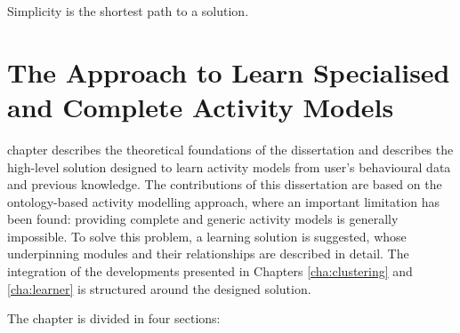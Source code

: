 

\begin{savequote}[50mm]
Simplicity is the shortest path to a solution.
\end{savequote}


\chapter{The Approach to Learn Specialised and Complete Activity Models}
\label{cha:archi}

\ifpdf
    \graphicspath{{3_approach_to_learning_eam/figures/PDF/}{3_approach_to_learning_eam/figures/PNG/}{3_approach_to_learning_eam/figures/}}
\else
    \graphicspath{{3_approach_to_learning_eam/figures/EPS/}{3_approach_to_learning_eam/figures/}}
\fi

 chapter describes the theoretical foundations of the dissertation and describes the high-level solution designed to learn activity models from user's behavioural data and previous knowledge. The contributions of this dissertation are based on the ontology-based activity modelling approach, where an important limitation has been found: providing complete and generic activity models is generally impossible. To solve this problem, a learning solution is suggested, whose underpinning modules and their relationships are described in detail. The integration of the developments presented in Chapters \ref{cha:clustering} and \ref{cha:learner} is structured around the designed solution.


The chapter is divided in four sections:

